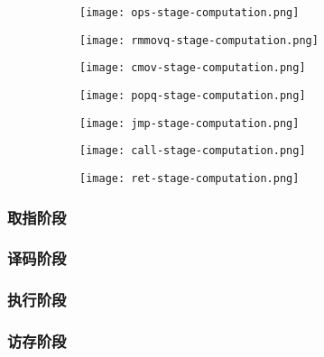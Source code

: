 \begin{figure}[H]
    \centering
    \begin{subfigure}[t]{0.45\textwidth}
        \centering
        \texttt{[image: ops-stage-computation.png]}
    \end{subfigure}\hfill
    \begin{subfigure}[t]{0.45\textwidth}
        \centering
        \texttt{[image: rmmovq-stage-computation.png]}
    \end{subfigure}
    \medskip
    \begin{subfigure}[t]{0.45\textwidth}
        \centering
        \texttt{[image: cmov-stage-computation.png]}
    \end{subfigure}\hfill
    \begin{subfigure}[t]{0.45\textwidth}
        \centering
        \texttt{[image: popq-stage-computation.png]}
    \end{subfigure}
    \medskip
    \begin{subfigure}[t]{0.45\textwidth}
        \centering
        \texttt{[image: jmp-stage-computation.png]}
    \end{subfigure}\hfill
    \begin{subfigure}[t]{0.45\textwidth}
        \centering
        \texttt{[image: call-stage-computation.png]}
    \end{subfigure}
    \medskip
    \begin{subfigure}[t]{0.45\textwidth}
        \centering
        \texttt{[image: ret-stage-computation.png]}
    \end{subfigure}
\end{figure}

\subsubsection{取指阶段}

\subsubsection{译码阶段}

\subsubsection{执行阶段}

\subsubsection{访存阶段}

